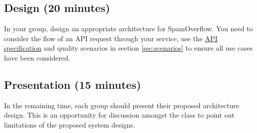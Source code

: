 \documentclass{csse4400}
\begin{document}


\subsection*{Design (20 minutes)}

In your group, design an appropriate architecture for SpamOverflow.
You need to consider the flow of an API request through your service,
use the \href{https://csse6400.uqcloud.net/api/spamoverflow}{API specification}
and quality scenarios in section \ref{sec:scenarios} to ensure all use cases have been considered.


\subsection*{Presentation (15 minutes)}

In the remaining time,
each group should present their proposed architecture design.
This is an opportunity for discussion amongst the class to point out limitations of the proposed system designs.
\end{document}
